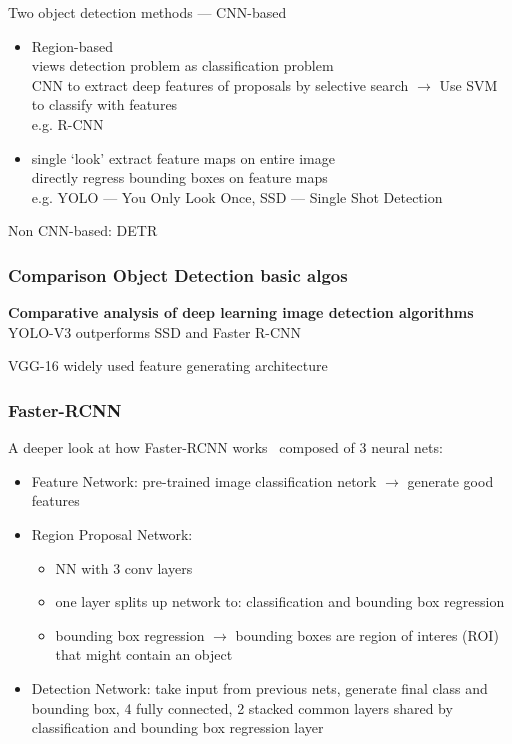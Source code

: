 Two object detection methods --- CNN-based
\begin{itemize}
    \item Region-based \\
        views detection problem as classification problem\\
        CNN to extract deep features of proposals by selective search $\rightarrow$  Use SVM to
            classify with features\\
        e.g. R-CNN
    \item  single `look'
        extract feature maps on entire image\\
        directly regress bounding boxes on feature maps\\
        e.g. YOLO --- You Only Look Once, SSD --- Single Shot Detection
\end{itemize}
Non CNN-based: DETR

\subsubsection*{Comparison Object Detection basic algos}
\textbf{Comparative analysis of deep learning image detection
algorithms}~\citep{srivastava_comparative_2021}
YOLO-V3 outperforms SSD and Faster R-CNN

VGG-16 widely used feature generating architecture

\subsubsection*{Faster-RCNN}
A deeper look at how Faster-RCNN works~\citep{goswami_deeper_2018}
composed of 3 neural nets:
\begin{itemize}
    \item Feature Network: pre-trained image classification netork $\rightarrow$ generate good features
    \item Region Proposal Network:
        \begin{itemize}
            \item NN with 3 conv layers
            \item one layer splits up network to: classification and bounding box regression
            \item bounding box regression $\rightarrow$ bounding boxes are region of interes (ROI)
                that might contain an object
        \end{itemize}
    \item Detection Network: take input from previous nets, generate final class and bounding box,
        4 fully connected, 2 stacked common layers shared by classification and bounding box regression
        layer \end{itemize}

